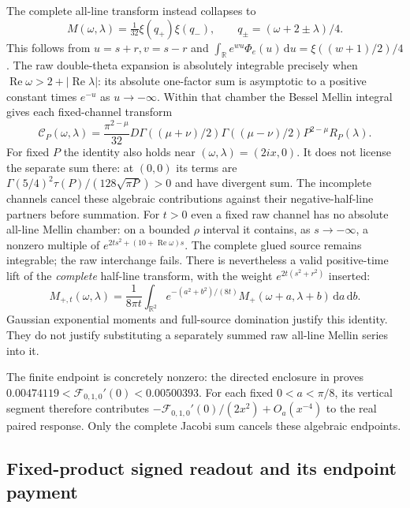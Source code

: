 \documentclass[11pt]{article}
\theoremstyle{definition}
\theoremstyle{remark}
\newcommand{\dd}{\,\mathrm d}
\newcommand{\Rea}{\operatorname{Re}}
\begin{document}
The complete all-line transform instead collapses to
\begin{equation}
 M(\omega,\lambda)=\tfrac1{32}\xi(q_+)\xi(q_-),\qquad
 q_\pm=(\omega+2\pm\lambda)/4. \label{pair-collapse}
\end{equation}
This follows from $u=s+r,v=s-r$ and
$\int_{\mathbb R}e^{wu}\Phi_e(u)\dd u=\xi((w+1)/2)/4$.
The raw double-theta expansion is absolutely integrable precisely when
$\Rea\omega>2+|\Rea\lambda|$: its absolute one-factor sum is asymptotic
to a positive constant times $e^{-u}$ as $u\to-\infty$.
Within that chamber the Bessel Mellin integral
\cite[10.43.19]{dlmfmellin} gives each fixed-channel transform
\begin{equation}
 \mathcal C_P(\omega,\lambda)=
 \frac{\pi^{2-\mu}}{32}D
 \Gamma((\mu+\nu)/2)\Gamma((\mu-\nu)/2)
 P^{2-\mu}R_P(\lambda). \label{pair-gamma}
\end{equation}
For fixed $P$ the identity also holds near $(\omega,\lambda)=(2ix,0)$.
It does not license the separate sum there: at $(0,0)$ its terms are
$\Gamma(5/4)^2\tau(P)/(128\sqrt{\pi P})>0$ and have divergent sum.
The incomplete channels cancel these algebraic contributions against
their negative-half-line partners before summation.
For $t>0$ even a fixed raw channel has no absolute all-line Mellin
chamber: on a bounded $\rho$ interval it contains, as $s\to-\infty$,
a nonzero multiple of $e^{2ts^2+(10+\Rea\omega)s}$.
The complete glued source remains integrable; the raw interchange fails.
There is nevertheless a valid positive-time lift of the \emph{complete}
half-line transform, with the weight $e^{2t(s^2+r^2)}$ inserted:
\[
 M_{+,t}(\omega,\lambda)=\frac1{8\pi t}\int_{\mathbb R^2}
 e^{-(a^2+b^2)/(8t)}M_+(\omega+a,\lambda+b)\dd a\dd b .
\]
Gaussian exponential moments and full-source domination justify this
identity. They do not justify substituting a separately summed raw
all-line Mellin series into it.

The finite endpoint is concretely nonzero: the directed enclosure in
\cite{pairedcontinuation} proves
$0.00474119<\mathcal F_{0,1,0}'(0)<0.00500393$.
For each fixed $0<a<\pi/8$, its vertical segment therefore contributes
$-\mathcal F_{0,1,0}'(0)/(2x^2)+O_a(x^{-4})$ to the real paired response.
Only the complete Jacobi sum cancels these algebraic endpoints.

\subsection{Fixed-product signed readout and its endpoint payment}
\end{document}
